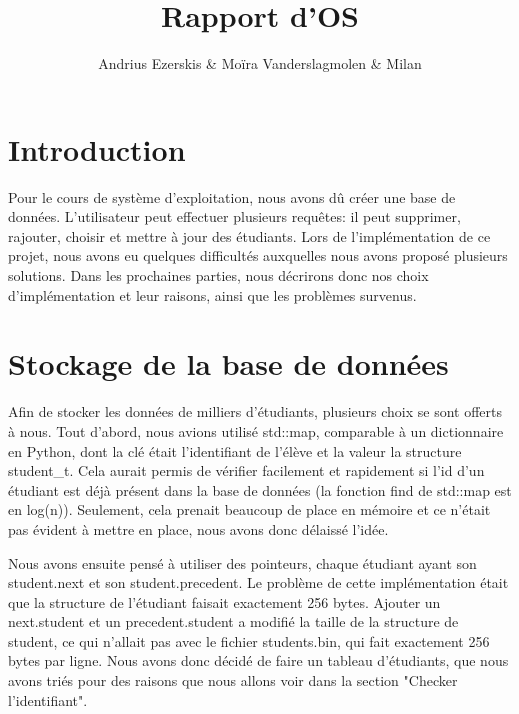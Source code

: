 \documentclass[utf8]{article}
\begin{document}
\begin{titlepage}
    

\author{Andrius Ezerskis \& Moïra Vanderslagmolen \& Milan }
\title{Rapport d'OS}

\maketitle
\end{titlepage}

\section{Introduction}
\par
Pour le cours de système d'exploitation, nous avons dû créer une base de données. 
L'utilisateur peut effectuer plusieurs requêtes: il peut supprimer, rajouter, choisir
et mettre à jour des étudiants. Lors de l'implémentation de ce projet, nous avons eu quelques difficultés
auxquelles nous avons proposé plusieurs solutions. Dans les prochaines parties, nous décrirons donc
nos choix d'implémentation et leur raisons, ainsi que les problèmes survenus.
\par


\section{Stockage de la base de données}
\indent{}
\par
Afin de stocker les données de milliers d'étudiants, plusieurs choix se sont offerts à nous. 
Tout d'abord, nous avions utilisé std::map, comparable à un dictionnaire en Python, dont la clé était l'identifiant de l'élève et la valeur la structure student\_t. 
Cela aurait permis de vérifier facilement et rapidement si l'id d'un étudiant est déjà présent dans la base de données (la fonction find de std::map est en log(n)).
Seulement, cela prenait beaucoup de place en mémoire et ce n'était pas évident à mettre en place, nous avons donc délaissé l'idée. 
\par
\indent{}
\par
Nous avons ensuite pensé à utiliser des pointeurs, chaque étudiant
ayant son student.next et son student.precedent. Le problème de cette implémentation était que la structure de l'étudiant faisait exactement 256 bytes.
Ajouter un next.student et un precedent.student a modifié la taille de la structure de student, ce qui n'allait pas avec le fichier students.bin, qui fait exactement 256 bytes par ligne.
Nous avons donc décidé de faire un tableau d'étudiants, que nous avons triés pour des raisons que nous allons voir dans la section "Checker l'identifiant".
\par
\end{document}
